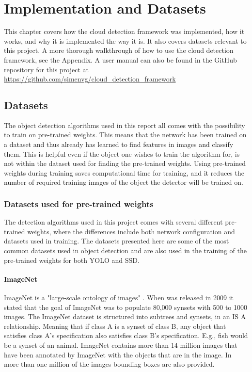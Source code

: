 
\chapter{Implementation and Datasets}

This chapter covers how the cloud detection framework was implemented, how it works, and why it is implemented the way it is. It also covers datasets relevant to this project. A more thorough walkthrough of how to use the cloud detection framework, see the Appendix. A user manual can also be found in the GitHub repository for this project at \url{https://github.com/simenvg/cloud_detection_framework}

\section{Datasets}
The object detection algorithms used in this report all comes with the possibility to train on pre-trained weights. This means that the network has been trained on a dataset and thus already has learned to find features in images and classify them. This is helpful even if the object one wishes to train the algorithm for, is not within the dataset used for finding the pre-trained weights. Using pre-trained weights during training saves computational time for training, and it reduces the number of required training images of the object the detector will be trained on.

\vspace{3mm}

\subsection{Datasets used for pre-trained weights}
The detection algorithms used in this project comes with several different pre-trained weights, where the differences include both network configuration and datasets used in training. The datasets presented here are some of the most common datasets used in object detection and are also used in the training of the pre-trained weights for both YOLO and SSD.


\subsubsection{ImageNet}
ImageNet is a "large-scale ontology of images" \citep{Deng2009}. When \citep{Deng2009} was released in 2009 it stated that the goal of ImageNet was to populate 80,000 synsets with 500 to 1000 images. The ImageNet dataset is structured into subtrees and synsets, in an IS A relationship. Meaning that if class A is a synset of class B, any object that satisfies class A's specification also satisfies class B's specification. E.g., fish would be a synset of an animal. ImageNet contains more than 14 million images that have been annotated by ImageNet with the objects that are in the image. In more than one million of the images bounding boxes are also provided. 



